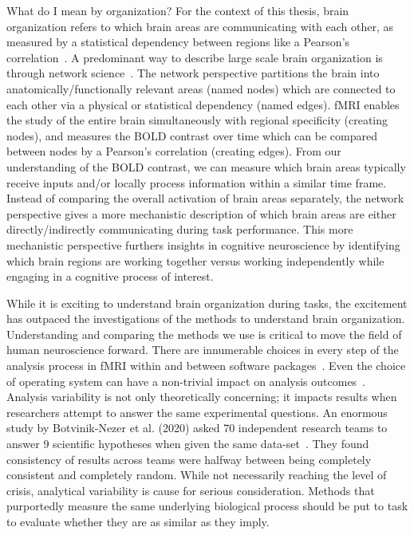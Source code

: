 \documentclass[phd,appendix,figures]{uithesis}
\begin{document}
What do I mean by organization?
For the context of this thesis, brain organization refers to which brain areas are communicating
with each other, as measured by a statistical dependency between
regions like a Pearson's correlation~\cite{Uddin2019}.
A predominant way to describe large scale brain organization is through network science~\cite{Rubinov2010}.
The network perspective partitions the brain into anatomically/functionally relevant areas (named nodes)
which are connected to each other via a physical or statistical dependency (named edges).
fMRI enables the study of the entire brain simultaneously with regional specificity (creating nodes),
and measures the BOLD contrast over time which can be compared between nodes by a Pearson's correlation (creating edges).
From our understanding of the BOLD contrast, we can measure which brain areas
typically receive inputs and/or locally process information within a similar time frame.
Instead of comparing the overall activation of brain areas separately, the network perspective
gives a more mechanistic description of which brain areas are either directly/indirectly
communicating during task performance.
This more mechanistic perspective furthers insights in cognitive neuroscience by identifying
which brain regions are working together versus working independently while engaging
in a cognitive process of interest.

While it is exciting to understand brain organization during tasks,
the excitement has outpaced the investigations of the methods to understand brain organization.
Understanding and comparing the methods we use is critical to move the field of
human neuroscience forward.
There are innumerable choices in every step of the analysis process in
fMRI within and between software packages~\cite{Bowring2019,Carp2012}.
Even the choice of operating system can have a non-trivial impact on
analysis outcomes~\cite{Glatard2015}.
Analysis variability is not only theoretically concerning; it impacts
results when researchers attempt to answer the same experimental questions.
An enormous study by Botvinik-Nezer et al. (2020) asked 70 independent research teams
to answer 9 scientific hypotheses when given the same data-set~\cite{Botvinik-Nezer2020}.
They found consistency of results across teams were halfway between
being completely consistent and completely random.
While not necessarily reaching the level of crisis,
analytical variability is cause for serious consideration.
Methods that purportedly measure the same underlying biological process
should be put to task to evaluate whether they are as similar
as they imply.
\end{document}
